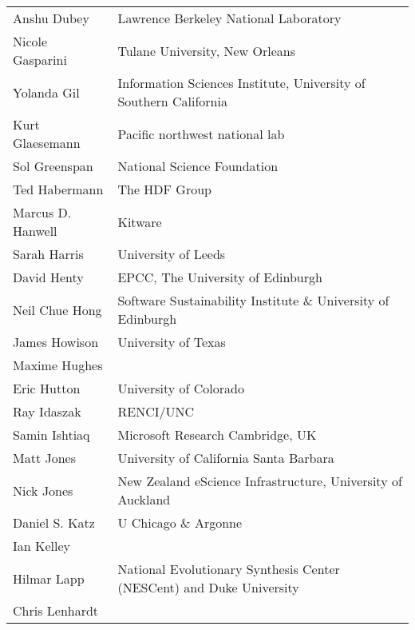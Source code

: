 \documentclass[11pt, oneside]{amsart}
\begin{document}
\begin{longtable}{ll}
Anshu Dubey           &  Lawrence Berkeley National Laboratory                                \\
Nicole Gasparini      &  Tulane University, New Orleans                                       \\
Yolanda Gil           &  Information Sciences Institute, University of Southern California    \\
Kurt Glaesemann       &  Pacific northwest national lab                                       \\
Sol Greenspan         &  National Science Foundation                                          \\
Ted Habermann         &  The HDF Group                                                        \\
Marcus D. Hanwell     &  Kitware                                                              \\
Sarah Harris          &  University of Leeds                                                  \\
David Henty           &  EPCC, The University of Edinburgh                                    \\
Neil Chue Hong        &  Software Sustainability Institute \& University of Edinburgh         \\
James Howison         &  University of Texas                                                  \\
Maxime Hughes         \\
Eric Hutton           &  University of Colorado                                               \\
Ray Idaszak           &  RENCI/UNC                                                            \\
Samin Ishtiaq         &  Microsoft Research Cambridge, UK                                     \\
Matt Jones            &  University of California Santa Barbara                               \\
Nick Jones            &  New Zealand eScience Infrastructure, University of Auckland          \\
Daniel S. Katz        &  U Chicago \& Argonne                                                 \\
Ian Kelley            \\
Hilmar Lapp           &  National Evolutionary Synthesis Center (NESCent) and Duke University \\
Chris Lenhardt        \\

\end{longtable}
\end{document}
